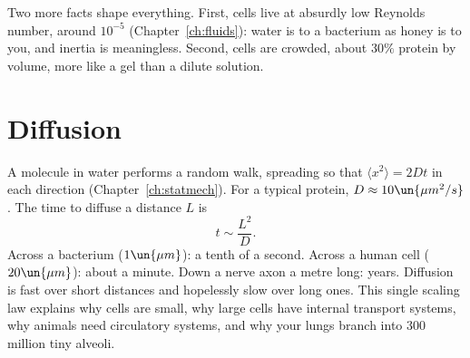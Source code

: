 Two more facts shape everything. First, cells live at absurdly low Reynolds number, around $10^{-5}$ (Chapter~\ref{ch:fluids}): water is to a bacterium as honey is to you, and inertia is meaningless. Second, cells are crowded, about $30\%$ protein by volume, more like a gel than a dilute solution.

\section{Diffusion}

A molecule in water performs a random walk, spreading so that $\langle x^2\rangle = 2Dt$ in each direction (Chapter~\ref{ch:statmech}). For a typical protein, $D\approx10\un{\mu m^2/s}$. The time to diffuse a distance $L$ is
\[
  t\sim\frac{L^2}{D}.
\]
Across a bacterium ($1\un{\mu m}$): a tenth of a second. Across a human cell ($20\un{\mu m}$): about a minute. Down a nerve axon a metre long: years. Diffusion is fast over short distances and hopelessly slow over long ones. This single scaling law explains why cells are small, why large cells have internal transport systems, why animals need circulatory systems, and why your lungs branch into $300$ million tiny alveoli.

